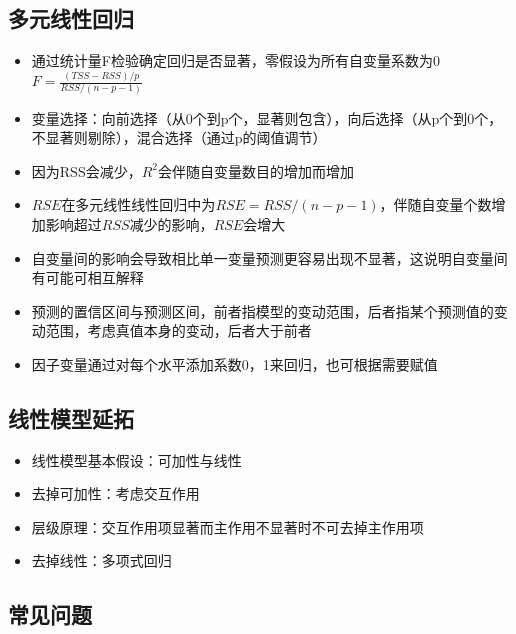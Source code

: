 \documentclass[]{book}
\providecommand{\tightlist}{%
  \setlength{\itemsep}{0pt}\setlength{\parskip}{0pt}}
\begin{document}
\subsection{多元线性回归}

\begin{itemize}
\tightlist
\item
  通过统计量F检验确定回归是否显著，零假设为所有自变量系数为0 \(F = \frac{(TSS - RSS)/p}{RSS/(n-p-1)}\)
\item
  变量选择：向前选择（从0个到p个，显著则包含），向后选择（从p个到0个，不显著则剔除），混合选择（通过p的阈值调节）
\item
  因为RSS会减少，\(R^2\)会伴随自变量数目的增加而增加
\item
  \(RSE\)在多元线性线性回归中为\(RSE = RSS/(n − p - 1)\)，伴随自变量个数增加影响超过\(RSS\)减少的影响，\(RSE\)会增大
\item
  自变量间的影响会导致相比单一变量预测更容易出现不显著，这说明自变量间有可能可相互解释
\item
  预测的置信区间与预测区间，前者指模型的变动范围，后者指某个预测值的变动范围，考虑真值本身的变动，后者大于前者
\item
  因子变量通过对每个水平添加系数0，1来回归，也可根据需要赋值
\end{itemize}

\subsection{线性模型延拓}

\begin{itemize}
\tightlist
\item
  线性模型基本假设：可加性与线性
\item
  去掉可加性：考虑交互作用
\item
  层级原理：交互作用项显著而主作用不显著时不可去掉主作用项
\item
  去掉线性：多项式回归
\end{itemize}

\hypertarget{-1}{%
\subsection{常见问题}\label{-1}}
\end{document}
